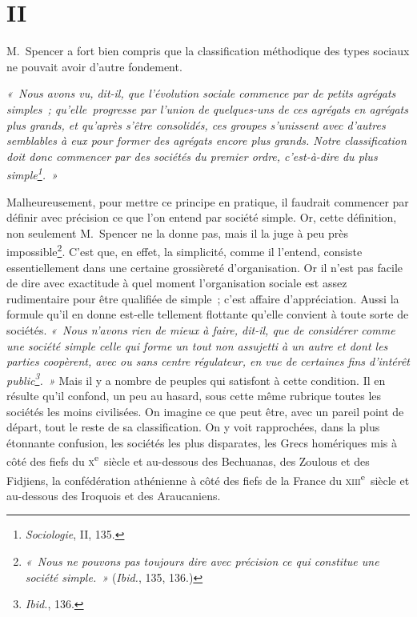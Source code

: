 \documentclass[french,twoside]{book} %
\begin{document}
\section[{II}]{II}
\noindent M. Spencer a fort bien compris que la classification méthodique des types sociaux ne pouvait avoir d’autre fondement.\par
\emph{« Nous avons vu, dit-il, que l’évolution sociale commence par de petits agrégats simples ; qu’elle progresse par l’union de quelques-uns de ces agrégats en agrégats plus grands, et qu’après s’être consolidés, ces groupes s’unissent avec d’autres semblables à eux pour former des agrégats encore plus grands. Notre classification doit donc commencer par des sociétés du premier ordre, c’est-à-dire du plus simple\footnote{\emph{Sociologie}, II, 135.}. »}\par
Malheureusement, pour mettre ce principe en pratique, il faudrait commencer par définir avec précision ce que l’on entend par société simple. Or, cette définition, non seulement M. Spencer ne la donne pas, mais il la juge à peu près impossible\footnote{\emph{ « Nous ne pouvons pas toujours dire avec précision ce qui constitue une société simple. »} ({\itshape Ibid.}, 135, 136.)}. C’est que, en effet, la simplicité, comme il l’entend, consiste essentiellement dans une certaine grossièreté d’organisation. Or il n’est pas facile de dire avec exactitude à quel moment l’organisation sociale est assez rudimentaire pour être qualifiée de simple ; c’est affaire d’appréciation. Aussi la formule qu’il en donne est-elle tellement flottante qu’elle convient à toute sorte de sociétés. \emph{« Nous n’avons rien de mieux à faire, dit-il, que de considérer comme une société simple celle qui forme un tout non assujetti à un autre et dont les parties coopèrent, avec ou sans centre régulateur, en vue de certaines fins d’intérêt public\footnote{{\itshape Ibid.}, 136.}. »} Mais il y a nombre de peuples qui satisfont à cette condition. Il en résulte qu’il confond, un peu au hasard, sous cette même rubrique toutes les sociétés les moins civilisées. On imagine ce que peut être, avec un pareil point de départ, tout le reste de sa classification. On y voit rapprochées, dans la plus étonnante confusion, les sociétés les plus disparates, les Grecs homériques mis à côté des fiefs du \textsc{x}\textsuperscript{e} siècle et au-dessous des Bechuanas, des Zoulous et des Fidjiens, la confédération athénienne à côté des fiefs de la France du \textsc{xiii}\textsuperscript{e} siècle et au-dessous des Iroquois et des Araucaniens.\par
\end{document}
